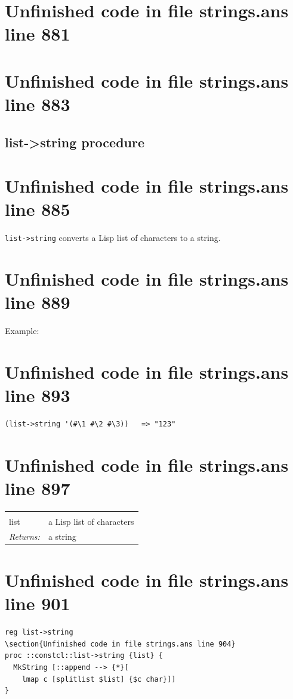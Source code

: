 \documentclass[twoside,9pt]{report}
\begin{document}
\section{Unfinished code in file strings.ans line 881}
\section{Unfinished code in file strings.ans line 883}
\subsection{list->string procedure}
\label{list->string-procedure}
\section{Unfinished code in file strings.ans line 885}


\texttt{list->string} converts a Lisp list of characters to a string.

\section{Unfinished code in file strings.ans line 889}


Example:

\section{Unfinished code in file strings.ans line 893}
\begin{verbatim}
(list->string '(#\1 #\2 #\3))   => "123"
\end{verbatim}
\section{Unfinished code in file strings.ans line 897}
\noindent\begin{tabular}{ |p{1.9cm} p{8cm}| }
\hline
\rowcolor[HTML]{CCCCCC} \multicolumn{2}{|l|}{\bf list->string (public)} \\
list & a Lisp list of characters \\
\textit{Returns:} & a string \\
\hline
\end{tabular}
\section{Unfinished code in file strings.ans line 901}
\begin{lstlisting}
reg list->string
\section{Unfinished code in file strings.ans line 904}
proc ::constcl::list->string {list} {
  MkString [::append --> {*}[
    lmap c [splitlist $list] {$c char}]]
}
\end{lstlisting}
\end{document}
